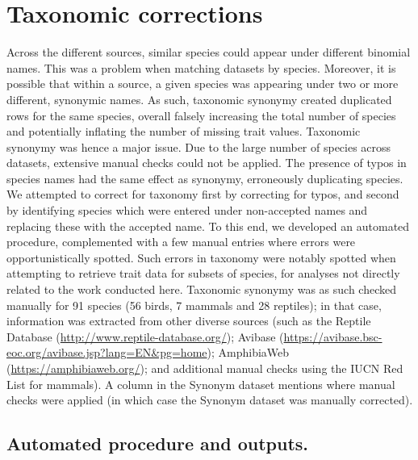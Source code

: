 \section{Taxonomic corrections}
Across the different sources, similar species could appear under different binomial names. This was a problem when matching datasets by species. Moreover, it is possible that within a source, a given species was appearing under two or more different, synonymic names. As such, taxonomic synonymy created duplicated rows for the same species, overall falsely increasing the total number of species and potentially inflating the number of missing trait values. Taxonomic synonymy was hence a major issue. Due to the large number of species across datasets, extensive manual checks could not be applied. The presence of typos in species names had the same effect as synonymy, erroneously duplicating species. We attempted to correct for taxonomy first by correcting for typos, and second by identifying species which were entered under non-accepted names and replacing these with the accepted name. To this end, we developed an automated procedure, complemented with a few manual entries where errors were opportunistically spotted. Such errors in taxonomy were notably spotted when attempting to retrieve trait data for subsets of species, for analyses not directly related to the work conducted here. Taxonomic synonymy was as such checked manually for 91 species (56 birds, 7 mammals and 28 reptiles); in that case, information was extracted from other diverse sources (such as the Reptile Database (\url{http://www.reptile-database.org/}); Avibase (\url{https://avibase.bsc-eoc.org/avibase.jsp?lang=EN\&pg=home}); AmphibiaWeb (\url{https://amphibiaweb.org/}); and additional manual checks using the IUCN Red List for mammals). A column in the Synonym dataset mentions where manual checks were applied (in which case the Synonym dataset was manually corrected). 


\subsection*{Automated procedure and outputs.}
